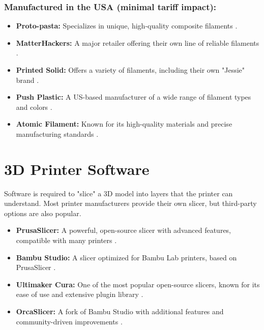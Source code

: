 \subsubsection{Manufactured in the USA (minimal tariff impact):}
\begin{itemize}
	\item \textbf{Proto-pasta:} Specializes in unique, high-quality composite filaments \supercite{ProtoPasta}.
	\item \textbf{MatterHackers:} A major retailer offering their own line of reliable filaments \supercite{MatterHackers}.
	\item \textbf{Printed Solid:} Offers a variety of filaments, including their own "Jessie" brand \supercite{PrintedSolid}.
	\item \textbf{Push Plastic:} A US-based manufacturer of a wide range of filament types and colors \supercite{PushPlastic}.
	\item \textbf{Atomic Filament:} Known for its high-quality materials and precise manufacturing standards \supercite{AtomicFilament}.
\end{itemize}

\section{3D Printer Software}\label{ch5:sec:software}
Software is required to "slice" a 3D model into layers that the printer can understand. Most printer manufacturers provide their own slicer, but third-party options are also popular.
\begin{itemize}
	\item \textbf{PrusaSlicer:} A powerful, open-source slicer with advanced features, compatible with many printers \supercite{PrusaSlicer}.
	\item \textbf{Bambu Studio:} A slicer optimized for Bambu Lab printers, based on PrusaSlicer \supercite{BambuStudio}.
	\item \textbf{Ultimaker Cura:} One of the most popular open-source slicers, known for its ease of use and extensive plugin library \supercite{Cura}.
	\item \textbf{OrcaSlicer:} A fork of Bambu Studio with additional features and community-driven improvements \supercite{OrcaSlicer}.
\end{itemize}


